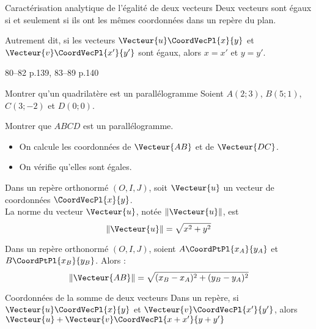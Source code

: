 \documentclass[a4paper]{article}
\begin{document}
\begin{proprieteadm}{Caractérisation analytique de l'égalité de deux vecteurs}{}
  Deux vecteurs sont égaux si et seulement si ils ont les mêmes coordonnées dans un repère du plan.

  Autrement dit, si les vecteurs $\Vecteur{u}\CoordVecPl{x}{y}$ et $\Vecteur{v}\CoordVecPl{x'}{y'}$ sont égaux, alors 
  $x=x'$ et $y=y'$.
\end{proprieteadm}

\begin{exercices}{}{}
  80--82 p.139, 83--89 p.140
\end{exercices}

\begin{methode}{Montrer qu'un quadrilatère est un parallélogramme}{}
  Soient $A(2;3)$, $B(5;1)$, $C(3;-2)$ et $D(0;0)$.
  
  Montrer que $ABCD$ est un parallélogramme.

  \begin{itemize}
    \item On calcule les coordonnées de $\Vecteur{AB}$ et de $\Vecteur{DC}$.
    \vspace{2cm}
    \item On vérifie qu'elles sont égales. 
    \vspace{2cm}
  \end{itemize}



\end{methode}


\begin{definition}{}{}
  Dans un repère orthonormé $(O,I,J)$, soit $\Vecteur{u}$ un vecteur de coordonnées $\CoordVecPl{x}{y}$.\\
  La norme du vecteur $\Vecteur{u}$, notée $ \left\lVert \Vecteur{u} \right\rVert$, est 
  $$ \left\lVert \Vecteur{u} \right\rVert = \sqrt{x^2+y^2} $$ 
\end{definition}

\begin{definition}{}{}
  Dans un repère orthonormé $(O,I,J)$, soient $A\CoordPtPl{x_A}{y_A}$ et $B\CoordPtPl{x_B}{y_B}$. Alors :
  $$ \left\lVert \Vecteur{AB} \right\rVert = \sqrt{(x_B-x_A)^2+(y_B-y_A)^2} $$ 
\end{definition}


\begin{propriete}{Coordonnées de la somme de deux vecteurs}{}
  Dans un repère, si $\Vecteur{u}\CoordVecPl{x}{y}$  et $\Vecteur{v}\CoordVecPl{x'}{y'}$, alors $\Vecteur{u}+\Vecteur{v}\CoordVecPl{x+x'}{y+y'}$
\end{propriete}
\end{document}
